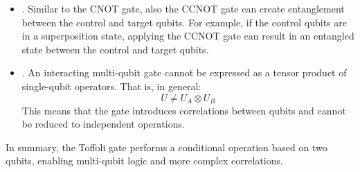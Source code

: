 \begin{itemize}
    \item {}. Similar to the CNOT gate, also the CCNOT gate can create entanglement between the control and target qubits. For example, if the control qubits are in a superposition state, applying the CCNOT gate can result in an entangled state between the control and target qubits.
    

    \item {}. An interacting multi-qubit gate cannot be expressed as a tensor product of single-qubit operators. That is, in general:
    \begin{equation*}
        U \neq U_A \otimes U_B
    \end{equation*}
    This means that the gate introduces correlations between qubits and cannot be reduced to independent operations.
\end{itemize}
In summary, the Toffoli gate performs a conditional operation based on two qubits, enabling multi-qubit logic and more complex correlations.